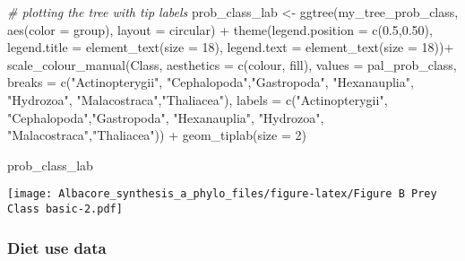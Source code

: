 \documentclass[
]{article}
\newenvironment{Shaded}{\begin{snugshade}}{\end{snugshade}}
\newcommand{\AttributeTok}[1]{\textcolor[rgb]{0.77,0.63,0.00}{#1}}
\newcommand{\CommentTok}[1]{\textcolor[rgb]{0.56,0.35,0.01}{\textit{#1}}}
\newcommand{\DecValTok}[1]{\textcolor[rgb]{0.00,0.00,0.81}{#1}}
\newcommand{\FloatTok}[1]{\textcolor[rgb]{0.00,0.00,0.81}{#1}}
\newcommand{\FunctionTok}[1]{\textcolor[rgb]{0.00,0.00,0.00}{#1}}
\newcommand{\NormalTok}[1]{#1}
\newcommand{\OtherTok}[1]{\textcolor[rgb]{0.56,0.35,0.01}{#1}}
\newcommand{\SpecialCharTok}[1]{\textcolor[rgb]{0.00,0.00,0.00}{#1}}
\newcommand{\StringTok}[1]{\textcolor[rgb]{0.31,0.60,0.02}{#1}}
\begin{document}
\begin{Shaded}
\begin{Highlighting}[]
\CommentTok{\# plotting the tree with tip labels}
\NormalTok{prob\_class\_lab }\OtherTok{\textless{}{-}} \FunctionTok{ggtree}\NormalTok{(my\_tree\_prob\_class, }\FunctionTok{aes}\NormalTok{(}\AttributeTok{color =}\NormalTok{ group), }\AttributeTok{layout =} \StringTok{\textquotesingle{}circular\textquotesingle{}}\NormalTok{) }\SpecialCharTok{+}
   \FunctionTok{theme}\NormalTok{(}\AttributeTok{legend.position =} \FunctionTok{c}\NormalTok{(}\FloatTok{0.5}\NormalTok{,}\FloatTok{0.50}\NormalTok{),}
        \AttributeTok{legend.title =} \FunctionTok{element\_text}\NormalTok{(}\AttributeTok{size =} \DecValTok{18}\NormalTok{), }
        \AttributeTok{legend.text =} \FunctionTok{element\_text}\NormalTok{(}\AttributeTok{size =} \DecValTok{18}\NormalTok{))}\SpecialCharTok{+}
  \FunctionTok{scale\_colour\_manual}\NormalTok{(}\StringTok{\textquotesingle{}Class\textquotesingle{}}\NormalTok{, }\AttributeTok{aesthetics =} \FunctionTok{c}\NormalTok{(}\StringTok{\textquotesingle{}colour\textquotesingle{}}\NormalTok{, }\StringTok{\textquotesingle{}fill\textquotesingle{}}\NormalTok{), }\AttributeTok{values =}\NormalTok{ pal\_prob\_class,}
                      \AttributeTok{breaks =} \FunctionTok{c}\NormalTok{(}\StringTok{"Actinopterygii"}\NormalTok{, }\StringTok{"Cephalopoda"}\NormalTok{,}\StringTok{"Gastropoda"}\NormalTok{, }\StringTok{"Hexanauplia"}\NormalTok{, }\StringTok{"Hydrozoa"}\NormalTok{, }\StringTok{"Malacostraca"}\NormalTok{,}\StringTok{"Thaliacea"}\NormalTok{),}
                      \AttributeTok{labels =} \FunctionTok{c}\NormalTok{(}\StringTok{"Actinopterygii"}\NormalTok{, }\StringTok{"Cephalopoda"}\NormalTok{,}\StringTok{"Gastropoda"}\NormalTok{, }\StringTok{"Hexanauplia"}\NormalTok{, }\StringTok{"Hydrozoa"}\NormalTok{, }\StringTok{"Malacostraca"}\NormalTok{,}\StringTok{"Thaliacea"}\NormalTok{)) }\SpecialCharTok{+}
  \FunctionTok{geom\_tiplab}\NormalTok{(}\AttributeTok{size =} \DecValTok{2}\NormalTok{)}

\NormalTok{prob\_class\_lab}
\end{Highlighting}
\end{Shaded}

\texttt{[image: Albacore\_synthesis\_a\_phylo\_files/figure-latex/Figure B Prey Class basic-2.pdf]}

\hypertarget{diet-use-data}{%
\subsubsection{Diet use data}\label{diet-use-data}}
\end{document}
